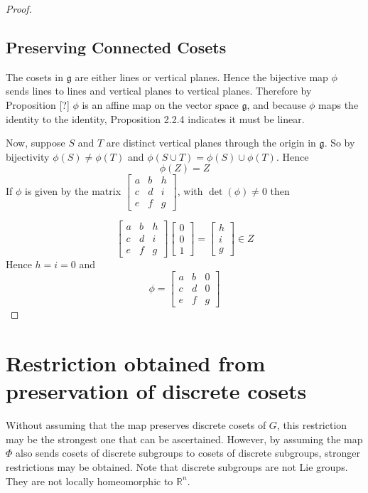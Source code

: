 \documentclass[honours]{UNSWthesis}
\newcommand{\R}{\mathbb{R}}
\newcommand{\g}{\mathfrak{g}}
\newcommand{\1}{\mathbf{e}_{1}}
\newcommand{\2}{\mathbf{e}_{3}}
\newcommand{\3}{\mathbf{e}_{3}}
\begin{document}
\begin{proof}
\subsection{Preserving Connected Cosets}
The cosets in $\g$ are either lines or vertical planes. Hence the bijective map $\phi$ sends lines to lines and vertical planes to vertical planes. Therefore by Proposition [?] $\phi$ is an affine map on the vector space $\g$, and because $\phi$ maps the identity to the identity, Proposition 2.2.4 indicates it must be linear.


Now, suppose $S$ and $T$ are distinct vertical planes through the origin in $\g$. So by bijectivity $\phi(S) \neq \phi(T)$ and $\phi(S \cup T)=\phi(S) \cup \phi(T)$. Hence 
\[
\phi(Z)=Z
\]
If $\phi$ is given by the matrix 
$\begin{bmatrix}
a & b & h \\
c & d & i \\
e & f & g
\end{bmatrix}
$, with $\det(\phi) \neq 0$ then 

\[
\begin{bmatrix}
a & b & h \\
c & d & i \\
e & f & g
\end{bmatrix} 
\begin{bmatrix}
0 \\ 0 \\ 1
\end{bmatrix} =
\begin{bmatrix}
h \\ i \\ g
\end{bmatrix} 
\in Z
\]
Hence $h=i=0$ and 
\[
\phi=
\begin{bmatrix}
a & b & 0 \\
c & d & 0 \\
e & f & g
\end{bmatrix}
\]

\end{proof}




\section{Restriction obtained from preservation of discrete cosets}
Without assuming that the map preserves discrete cosets of $G$, this restriction may be the strongest one that can be ascertained. However, by assuming the map $\Phi$ also sends cosets of discrete subgroups to cosets of discrete subgroups, stronger restrictions may be obtained. Note that discrete subgroups are not Lie groups. They are not locally homeomorphic to $\R^{n}$. 
\end{document}
